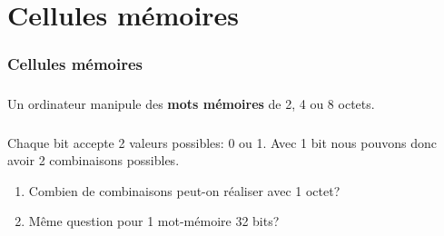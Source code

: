 \documentclass[svgnames,11pt]{beamer}
\begin{document}
\section{Cellules mémoires}
\begin{frame}
    \frametitle{Cellules mémoires}

    \begin{center}
    \end{center}

\end{frame}
\begin{frame}
    \frametitle{}

    \begin{center}
    \end{center}

\end{frame}
\begin{frame}
    \frametitle{}
\begin{aretenir}[]
Un ordinateur manipule des \textbf{mots mémoires} de 2, 4 ou 8 octets.
\end{aretenir}
    \begin{center}
    \end{center}

\end{frame}
\begin{frame}
    \frametitle{}

    \begin{activite}
        Chaque bit accepte 2 valeurs possibles: 0 ou 1. Avec 1 bit nous pouvons donc avoir 2 combinaisons possibles.
        \begin{enumerate}
        \item Combien de combinaisons peut-on réaliser avec 1 octet?
        \item Même question pour 1 mot-mémoire 32 bits?
        \end{enumerate}
        \end{activite}

\end{frame}
\end{document}
